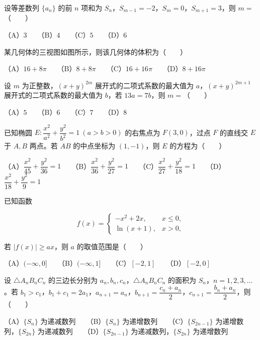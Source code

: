 \begin{question}
设等差数列 $\{a_n\}$ 的前 $n$ 项和为 $S_n$，$S_{m-1}=-2$，$S_m=0$，$S_{m+1}=3$，则 $m=$\mbox{（　　）}

（A）$3$　　（B）$4$　　（C）$5$　　（D）$6$

\Needspace{0.4\textheight}
\end{question}
\begin{question}
某几何体的三视图如图所示，则该几何体的体积为\mbox{（　　）}
\nopagebreak[4]
\begin{center}\end{center}
\nopagebreak[4]
（A）$16+8\pi$　　（B）$8+8\pi$　　（C）$16+16\pi$　　（D）$8+16\pi$

\end{question}
\begin{question}
设 $m$ 为正整数，$(x+y)^{2m}$ 展开式的二项式系数的最大值为 $a$，$(x+y)^{2m+1}$ 展开式的二项式系数的最大值为 $b$，若 $13a=7b$，则 $m=$\mbox{（　　）}

（A）$5$　　（B）$6$　　（C）$7$　　（D）$8$

\end{question}
\begin{question}
已知椭圆 $E:\dfrac{x^2}{a^2}+\dfrac{y^2}{b^2}=1\ (a>b>0)$ 的右焦点为 $F(3,0)$，过点 $F$ 的直线交 $E$ 于 $A,B$ 两点。若 $AB$ 的中点坐标为 $(1,-1)$，则 $E$ 的方程为\mbox{（　　）}

（A）$\dfrac{x^2}{45}+\dfrac{y^2}{36}=1$　　（B）$\dfrac{x^2}{36}+\dfrac{y^2}{27}=1$　　（C）$\dfrac{x^2}{27}+\dfrac{y^2}{18}=1$　　（D）$\dfrac{x^2}{18}+\dfrac{y^2}{9}=1$

\end{question}
\begin{question}
已知函数

\nopagebreak[4]
\[
f(x)=\begin{cases}
-x^2+2x,&x\leqslant0,\\
\ln(x+1),&x>0,
\end{cases}
\]

若 $|f(x)|\geqslant ax$，则 $a$ 的取值范围是\mbox{（　　）}

（A）$(-\infty,0]$　　（B）$(-\infty,1]$　　（C）$[-2,1]$　　（D）$[-2,0]$

\end{question}
\begin{question}
设 $\triangle A_nB_nC_n$ 的三边长分别为 $a_n,b_n,c_n$，$\triangle A_nB_nC_n$ 的面积为 $S_n$，$n=1,2,3,\ldots$。若 $b_1>c_1$，$b_1+c_1=2a_1$，$a_{n+1}=a_n$，$b_{n+1}=\dfrac{c_n+a_n}{2}$，$c_{n+1}=\dfrac{b_n+a_n}{2}$，则\mbox{（　　）}

（A）$\{S_n\}$ 为递减数列　　（B）$\{S_n\}$ 为递增数列　　（C）$\{S_{2n-1}\}$ 为递增数列，$\{S_{2n}\}$ 为递减数列　　（D）$\{S_{2n-1}\}$ 为递减数列，$\{S_{2n}\}$ 为递增数列

\end{question}

